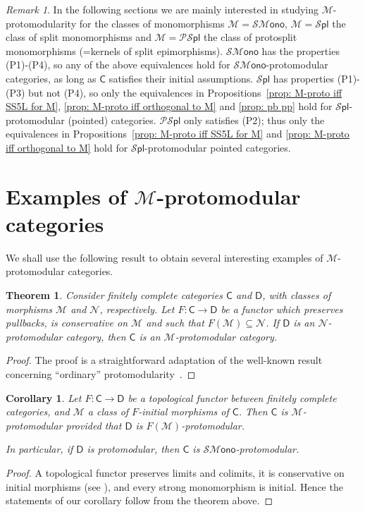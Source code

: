 \documentclass[11pt]{amsart}
\theoremstyle{plain}
\newtheorem{theorem}[subsection]{Theorem}
\newtheorem{corollary}[subsection]{Corollary}
\theoremstyle{definition}
\theoremstyle{remark}
\newtheorem{remark}[subsection]{Remark}
\newcommand{\todo}[1]{{\color{red} [#1]}}
\newcommand{\C}{\ensuremath{\mathsf{C}}}
\newcommand{\D}{\ensuremath{\mathsf{D}}}
\newcommand{\M}{\ensuremath{\mathscr{M}}}
\newcommand{\N}{\ensuremath{\mathscr{N}}}
\newcommand{\SMono}{\ensuremath{\mathscr{SM}\mathsf{ono}}}
\newcommand{\Spl}{\ensuremath{\mathscr{S}\mathsf{pl}}}
\newcommand{\PSpl}{\ensuremath{\mathscr{PS}\mathsf{pl}}}
\begin{document}
\begin{remark} In the following sections we are mainly interested in studying $\M$-protomodularity for the classes of monomorphisms $\M=\SMono$, $\M=\Spl$ the class of split monomorphisms and $\M=\PSpl$ the class of protosplit monomorphisms (=kernels of split epimorphisms). $\SMono$ has the properties (P1)-(P4), so any of the above equivalences hold for $\SMono$-protomodular categories, as long as $\C$ satisfies their initial assumptions. $\Spl$ has properties (P1)-(P3) but not (P4), so only the equivalences in Propositions~\ref{prop: M-proto iff SS5L for M}, \ref{prop: M-proto iff orthogonal to M} and \ref{prop: pb pp} hold for $\Spl$-protomodular (pointed) categories. $\PSpl$ only satisfies (P2); thus only the equivalences in Propositions~\ref{prop: M-proto iff SS5L for M} and \ref{prop: M-proto iff orthogonal to M} hold for $\Spl$-protomodular pointed categories.
\end{remark}

\section{Examples of $\M$-protomodular categories}\label{sec: Exs}

We shall use the following result to obtain several interesting examples of $\M$-protomodular categories.

\begin{theorem}\label{thm: F:CC->DD} Consider finitely complete categories $\C$ and $\D$, with classes of morphisms $\M$ and $\N$, respectively. Let $F\colon \C\to \D$ be a  functor which preserves pullbacks, is conservative on $\M$ and such that $F(\M)\subseteq\N$. If $\D$ is an $\N$-protomodular category, then $\C$ is an $\M$-protomodular category.
\end{theorem}
\begin{proof} The proof is a straightforward adaptation of the well-known result concerning  ``ordinary'' protomodularity~\cite{NEKEAC}.
\end{proof}

\begin{corollary}\label{cor:top}
Let $F\colon \C\to \D$ be a topological functor between finitely complete categories, and $\M$ a class of $F$-initial morphisms of $\C$. Then $\C$ is $\M$-protomodular provided that $\D$ is $F(\M)$-protomodular.

In particular, if $\D$ is protomodular, then $\C$ is $\SMono$-protomodular.
\end{corollary}
\begin{proof}
A topological functor preserves limits and colimits, it is conservative on initial morphisms (see \cite{ST}), and every strong monomorphism is initial. Hence the statements of our corollary follow from the theorem above.
\end{proof}
\end{document}
